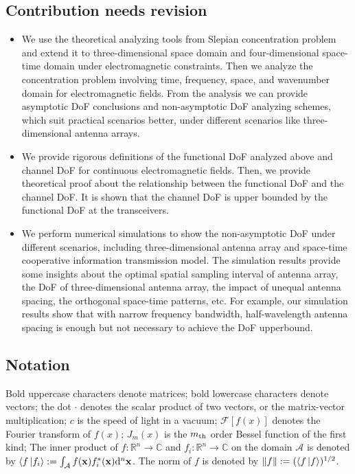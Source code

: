 \documentclass[12pt,draftclsnofoot,journal,onecolumn]{IEEEtran}
\begin{document}
\subsection{Contribution {\color{red} needs revision}}
\begin{itemize}
	\item{We use the theoretical analyzing tools from Slepian concentration problem and extend it to three-dimensional space domain and four-dimensional space-time domain under electromagnetic constraints. Then we analyze the concentration problem involving time, frequency, space, and wavenumber domain for electromagnetic fields. From the analysis we can provide asymptotic DoF conclusions and non-asymptotic DoF analyzing schemes, which suit practical scenarios better, under different scenarios like three-dimensional antenna arrays. }
	\item{We provide rigorous definitions of the functional DoF analyzed above and channel DoF for continuous electromagnetic fields. Then, we provide theoretical proof about the relationship between the functional DoF and the channel DoF. It is shown that the channel DoF is upper bounded by the functional DoF at the transceivers.} 
	\item{We perform numerical simulations to show the non-asymptotic DoF under different scenarios, including three-dimensional antenna array and space-time cooperative information transmission model. The simulation results provide some insights about the optimal spatial sampling interval of antenna array, the DoF of three-dimensional antenna array, the impact of unequal antenna spacing, the orthogonal space-time patterns, etc. For example, our simulation results show that with narrow frequency bandwidth, half-wavelength antenna spacing is enough but not necessary to achieve the DoF upperbound.}	
\end{itemize}

\subsection{Notation}
Bold uppercase characters denote matrices;
bold lowercase characters denote vectors;
the dot $\cdot$ denotes the scalar product of two vectors, or the matrix-vector multiplication; 
$c$ is the speed of light in a vacuum; 
$\mathscr{F}[f(x)]$ denotes the Fourier transform of $f(x)$; 
$J_m(x)$ is the $m_{\rm th}$ order Bessel function of the first kind; 
The inner product of $f: \mathbb{R}^n \rightarrow \mathbb{C}$ and $f_i: \mathbb{R}^n \rightarrow \mathbb{C}$ on the domain $\mathcal{A}$ is denoted by $\langle f \ket{f_i}:= \int_{\mathcal{A}} f({\bf x}) f_i^*({\bf x}) {\rm d}^n{\bf x}$. The norm of $f$ is denoted by $\left\| f \right\|:=(\langle f \ket{f})^{1/2} $. 
\end{document}
